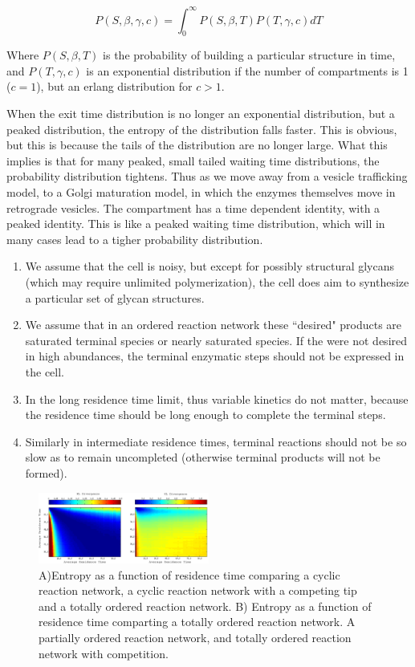 \documentclass{article}
\begin{document}
\begin{equation} 
P(S,\beta,\gamma,c)=\int_0^\infty P(S,\beta,T)P(T,\gamma,c)dT
\end{equation}

Where $P(S,\beta,T)$ is the probability of building a particular structure in time, and $P(T,\gamma,c)$ is an exponential distribution if the number of compartments is 1 ($c=1$), but an erlang distribution for $c>1$. 

When the exit time distribution is no longer an exponential distribution, but a peaked distribution, the entropy of the distribution falls faster. This is obvious, but this is because the tails of the distribution are no longer large. What this implies is that for many peaked, small tailed waiting time distributions, the probability distribution tightens. Thus as we move away from a vesicle trafficking model, to a Golgi maturation model, in which the enzymes themselves move in retrograde vesicles. The compartment has a time dependent identity, with a peaked identity. This is like a peaked waiting time distribution, which will in many cases lead to a tigher probability distribution. 

\begin{enumerate}
\item We assume that the cell is noisy, but except for possibly structural glycans (which may require unlimited polymerization), the cell does aim to synthesize a particular set of glycan structures.
\item We assume that in an ordered reaction network these ``desired" products are saturated terminal species or nearly saturated species. If the were not desired in high abundances, the terminal enzymatic steps should not be expressed in the cell. 
\item In the long residence time limit, thus variable kinetics do not matter, because the residence time should be long enough to complete the terminal steps. 
\item Similarly in intermediate residence times, terminal reactions should not be so slow as to remain uncompleted (otherwise terminal products will not be formed).  
\end{enumerate}


\begin{figure}[h]
    \includegraphics[width=0.5\textwidth]{Figure_5.pdf}
	\caption{A)Entropy as a function of residence time comparing a cyclic reaction network, a cyclic reaction network with a competing tip and a totally ordered reaction network. B) Entropy as a function of residence time comparting a totally ordered reaction network. A partially ordered reaction network, and totally ordered reaction network with competition.}
\end{figure}
\end{document}
